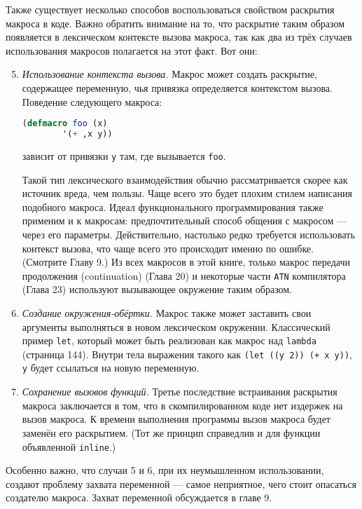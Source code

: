 \documentclass[12pt, a4paper]{article} %
\begin{document}
Также существует несколько способов воспользоваться свойством раскрытия макроса в коде. Важно обратить внимание на то, что раскрытие таким образом появляется в лексическом контексте вызова макроса, так как два из трёх случаев использования макросов полагается на этот факт. Вот они:

\begin{enumerate} \setcounter{enumi}{4}
    \item \textit{Использование контекста вызова.} Макрос может создать раскрытие, содержащее переменную, чья привязка определяется контекстом вызова. Поведение следующего макроса:
\begin{lstlisting}[language=Lisp]
    (defmacro foo (x)
        '(+ ,x y))
\end{lstlisting}
    зависит от привязки \texttt{y} там, где вызывается \texttt{foo}.

    Такой тип лексического взаимодействия обычно рассматривается скорее как источник вреда, чем пользы. Чаще всего это будет плохим стилем написания подобного макроса. Идеал функционального программирования также применим и к макросам: предпочтительный способ общения с макросом --- через его параметры. Действительно, настолько редко требуется использовать контекст вызова, что чаще всего это происходит именно по ошибке. (Смотрите Главу 9.) Из всех макросов в этой книге, только макрос передачи продолжения (continuation) (Глава 20) и некоторые части \texttt{ATN} компилятора (Глава 23) используют вызывающее окружение таким образом. 
    \item \textit{Создание окружения-обёртки.} Макрос также может заставить свои аргументы выполняться в новом лексическом окружении. Классический пример \texttt{let}, который может быть реализован как макрос над \texttt{lambda} (страница 144). Внутри тела выражения такого как \texttt{(let ((y 2)) (+ x y))}, \texttt{y} будет ссылаться на новую переменную.

    \item \textit{Сохранение вызовов функций.} Третье последствие встраивания раскрытия макроса заключается в том, что в скомпилированном коде нет издержек на вызов макроса. К времени выполнения программы вызов макроса будет заменён его раскрытием. (Тот же принцип справедлив и для функции объявленной \texttt{inline}.)
\end{enumerate}

Особенно важно, что случаи 5 и 6, при их неумышленном использовании, создают проблему захвата переменной --- самое неприятное, чего стоит опасаться создателю макроса. Захват переменной обсуждается в главе 9.
\end{document}
